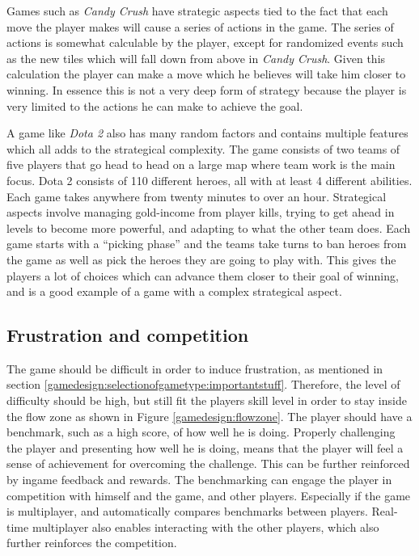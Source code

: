 Games such as \textit{Candy Crush}\cite{candycrush} have strategic aspects tied to the fact that each move the player makes will cause a series of actions in the game.
The series of actions is somewhat calculable by the player, except for randomized events such as the new tiles which will fall down from above in \textit{Candy Crush}.
Given this calculation the player can make a move which he believes will take him closer to winning.
In essence this is not a very deep form of strategy because the player is very limited to the actions he can make to achieve the goal.

A game like \textit{Dota 2}\cite{Dota2} also has many random factors and contains multiple features which all adds to the strategical complexity.
The game consists of two teams of five players that go head to head on a large map where team work is the main focus.
Dota 2 consists of 110 different heroes, all with at least 4 different abilities.
Each game takes anywhere from twenty minutes to over an hour.
Strategical aspects involve managing gold-income from player kills, trying to get ahead in levels to become more powerful, and adapting to what the other team does.
Each game starts with a ``picking phase'' and the teams take turns to ban heroes from the game as well as pick the heroes they are going to play with.
This gives the players a lot of choices which can advance them closer to their goal of winning, and is a good example of a game with a complex strategical aspect.

\subsection{Frustration and competition}\label{selectionofgametype:frustration}
The game should be difficult in order to induce frustration, as mentioned in section \ref{gamedesign:selectionofgametype:importantstuff}.
Therefore, the level of difficulty should be high, but still fit the players skill level in order to stay inside the flow zone as shown in Figure \ref{gamedesign:flowzone}.
The player should have a benchmark, such as a high score, of how well he is doing.
Properly challenging the player and presenting how well he is doing, means that the player will feel a sense of achievement for overcoming the challenge.
This can be further reinforced by ingame feedback and rewards.
The benchmarking can engage the player in competition with himself and the game, and other players.
Especially if the game is multiplayer, and automatically compares benchmarks between players.
Real-time multiplayer also enables interacting with the other players, which also further reinforces the competition.

